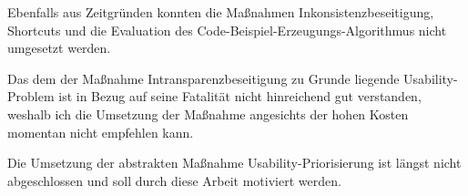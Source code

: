 Ebenfalls aus Zeitgründen konnten die Maßnahmen Inkonsistenzbeseitigung, Shortcuts und die Evaluation des Code-Beispiel-Erzeugungs-Algorithmus nicht umgesetzt werden.

Das dem der Maßnahme Intransparenzbeseitigung zu Grunde liegende Usability-Problem  ist in Bezug auf seine Fatalität nicht hinreichend gut verstanden, weshalb ich die Umsetzung der Maßnahme angesichts der hohen Kosten momentan nicht empfehlen kann.

Die Umsetzung der abstrakten Maßnahme Usability-Priorisierung ist längst nicht abgeschlossen und soll durch diese Arbeit motiviert werden.